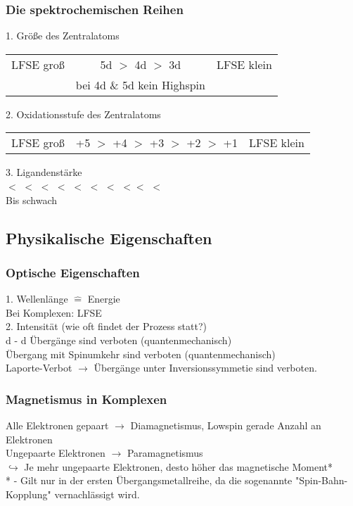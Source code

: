 \documentclass{article}
\begin{document}
\subsubsection{Die spektrochemischen Reihen}
1. Größe des Zentralatoms\\
\begin{center}
    \begin{tabular}{c c c}
        LFSE groß & 5d $>$ 4d $>$ 3d & LFSE klein\\
        & bei 4d \& 5d kein Highspin &\\
    \end{tabular}
\end{center}
2. Oxidationsstufe des Zentralatoms\\
\begin{center}
    \begin{tabular}{c c c}
        LFSE groß & +5 $>$ +4 $>$ +3 $>$ +2 $>$ +1 & LFSE klein\\
    \end{tabular}
\end{center}
3. Ligandenstärke\\
 $<$  $<$  $<$  $<$  $<$  $<$  $<$  $<<$  $<$ \\
Bis  schwach\\

\subsection{Physikalische Eigenschaften}
\subsubsection{Optische Eigenschaften}
1. Wellenlänge $\hat{=}$ Energie\\
Bei Komplexen: LFSE\\
2. Intensität (wie oft findet der Prozess statt?)\\
d - d Übergänge sind verboten (quantenmechanisch)\\
Übergang mit Spinumkehr sind verboten (quantenmechanisch)\\
Laporte-Verbot $\rightarrow$ Übergänge unter Inversionssymmetie sind verboten.\\
\subsubsection{Magnetismus in Komplexen}
Alle Elektronen gepaart $\rightarrow$ Diamagnetismus, Lowspin gerade Anzahl an Elektronen\\
Ungepaarte Elektronen $\rightarrow$ Paramagnetismus\\
$\hookrightarrow$ Je mehr ungepaarte Elektronen, desto höher das magnetische Moment*\\
* - Gilt nur in der ersten Übergangsmetallreihe, da die sogenannte "Spin-Bahn-Kopplung" vernachlässigt wird.\\
\end{document}
